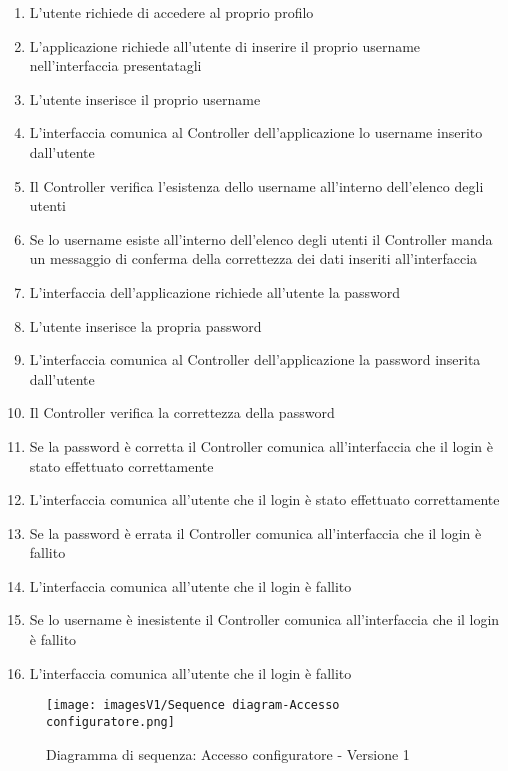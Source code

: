 \begin{enumerate}
    \item L'utente richiede di accedere al proprio profilo
    \item L'applicazione richiede all'utente di inserire il proprio username nell'interfaccia presentatagli
    \item L'utente inserisce il proprio username
    \item L'interfaccia comunica al Controller dell'applicazione lo username inserito dall'utente
    \item Il Controller verifica l'esistenza dello username all'interno dell'elenco degli utenti
    \item Se lo username esiste all'interno dell'elenco degli utenti il Controller manda un messaggio di conferma della correttezza dei dati inseriti all'interfaccia
    \item L'interfaccia dell'applicazione richiede all'utente la password
    \item L'utente inserisce la propria password
    \item L'interfaccia comunica al Controller dell'applicazione la password inserita dall'utente
    \item Il Controller verifica la correttezza della password
    \item Se la password è corretta il Controller comunica all'interfaccia che il login è stato effettuato correttamente
    \item L'interfaccia comunica all'utente che il login è stato effettuato correttamente
    \item Se la password è errata il Controller comunica all'interfaccia che il login è fallito
    \item L'interfaccia comunica all'utente che il login è fallito
    \item Se lo username è inesistente il Controller comunica all'interfaccia che il login è fallito
    \item L'interfaccia comunica all'utente che il login è fallito
\end{enumerate}

\begin{figure}[!]
\centering
\texttt{[image: imagesV1/Sequence diagram-Accesso configuratore.png]}
\caption{\label{fig:Sequence diagram 1.1}Diagramma di sequenza: Accesso configuratore - Versione 1}
\end{figure}\bigskip

